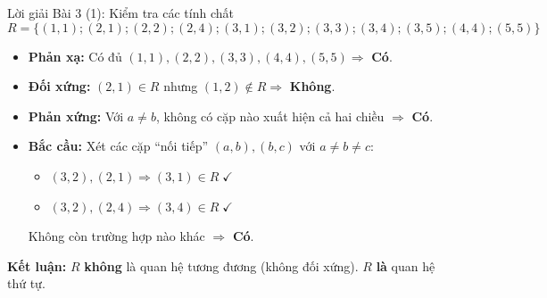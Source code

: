 \documentclass[12pt,a4paper]{article}
\newcommand{\yes}{\textcolor{AccentGreen}{\textbf{Có}}}
\newcommand{\no}{\textcolor{AccentRed}{\textbf{Không}}}
\begin{document}
\begin{baitap}{Lời giải Bài 3 (1): Kiểm tra các tính chất}
\[
  R = \{(1,1); (2,1); (2,2); (2,4); (3,1); (3,2); (3,3); (3,4); (3,5); (4,4); (5,5)\}
\]

\noindent
\begin{minipage}[c]{0.60\textwidth}
\begin{itemize}
  \item \textbf{Phản xạ:} Có đủ $(1,1), (2,2), (3,3), (4,4), (5,5) \Rightarrow$ \yes.
  \item \textbf{Đối xứng:} $(2, 1) \in R$ nhưng $(1, 2) \notin R \Rightarrow$ \no.
  \item \textbf{Phản xứng:} Với $a \neq b$, không có cặp nào xuất hiện cả hai chiều $\Rightarrow$ \yes.
  \item \textbf{Bắc cầu:} Xét các cặp ``nối tiếp'' $(a, b), (b, c)$ với $a \neq b \neq c$:
  \begin{itemize}
    \item $(3, 2), (2, 1) \Rightarrow (3, 1) \in R\;\checkmark$
    \item $(3, 2), (2, 4) \Rightarrow (3, 4) \in R\;\checkmark$
  \end{itemize}
  Không còn trường hợp nào khác $\Rightarrow$ \yes.
\end{itemize}
\end{minipage}
\hfill
\begin{minipage}[c]{0.36\textwidth}
\centering
{}
\end{minipage}

\textbf{\textcolor{AccentRed}{Kết luận:}} $R$ \textbf{không} là quan hệ tương đương (không đối xứng). $R$ \textbf{là} quan hệ thứ tự.
\end{baitap}
\end{document}
